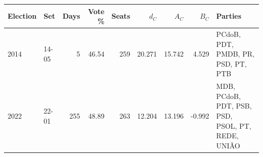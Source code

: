 \begin{tabularx}{\textwidth}{@{}llrrrrrr>{\raggedright\arraybackslash}X@{}}
\toprule
Election & Set & Days & Vote \% & Seats & \(d_C\) & \(A_C\) & \(B_C\) & Parties \\
\midrule
2014 & 14-05 & 5 & 46.54 & 259 & 20.271 & 15.742 & 4.529 & PCdoB, PDT, PMDB, PR, PSD, PT, PTB \\
2022 & 22-01 & 255 & 48.89 & 263 & 12.204 & 13.196 & -0.992 & MDB, PCdoB, PDT, PSB, PSD, PSOL, PT, REDE, UNIÃO \\
\bottomrule
\end{tabularx}

